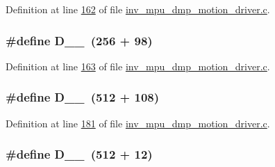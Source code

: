 Definition at line \hyperlink{inv__mpu__dmp__motion__driver_8c_source_l00162}{162} of file \hyperlink{inv__mpu__dmp__motion__driver_8c_source}{inv\+\_\+mpu\+\_\+dmp\+\_\+motion\+\_\+driver.\+c}.

\subsubsection[{\texorpdfstring{D\+\_\+1\+\_\+98}{D_1_98}}]{\setlength{\rightskip}{0pt plus 5cm}\#define D\+\_\+\_~(256 + 98)}\hypertarget{group___d_r_i_v_e_r_s_gaa3060f343d69794f21fcb65974c135bd}{}\label{group___d_r_i_v_e_r_s_gaa3060f343d69794f21fcb65974c135bd}


Definition at line \hyperlink{inv__mpu__dmp__motion__driver_8c_source_l00163}{163} of file \hyperlink{inv__mpu__dmp__motion__driver_8c_source}{inv\+\_\+mpu\+\_\+dmp\+\_\+motion\+\_\+driver.\+c}.

\subsubsection[{\texorpdfstring{D\+\_\+2\+\_\+108}{D_2_108}}]{\setlength{\rightskip}{0pt plus 5cm}\#define D\+\_\+\_~(512 + 108)}\hypertarget{group___d_r_i_v_e_r_s_ga09ccdf661a9ab9f8df8f2c7070d0dff9}{}\label{group___d_r_i_v_e_r_s_ga09ccdf661a9ab9f8df8f2c7070d0dff9}


Definition at line \hyperlink{inv__mpu__dmp__motion__driver_8c_source_l00181}{181} of file \hyperlink{inv__mpu__dmp__motion__driver_8c_source}{inv\+\_\+mpu\+\_\+dmp\+\_\+motion\+\_\+driver.\+c}.

\subsubsection[{\texorpdfstring{D\+\_\+2\+\_\+12}{D_2_12}}]{\setlength{\rightskip}{0pt plus 5cm}\#define D\+\_\+\_~(512 + 12)}\hypertarget{group___d_r_i_v_e_r_s_ga57d4674cf7793419f7dfa54606c73bf2}{}\label{group___d_r_i_v_e_r_s_ga57d4674cf7793419f7dfa54606c73bf2}


